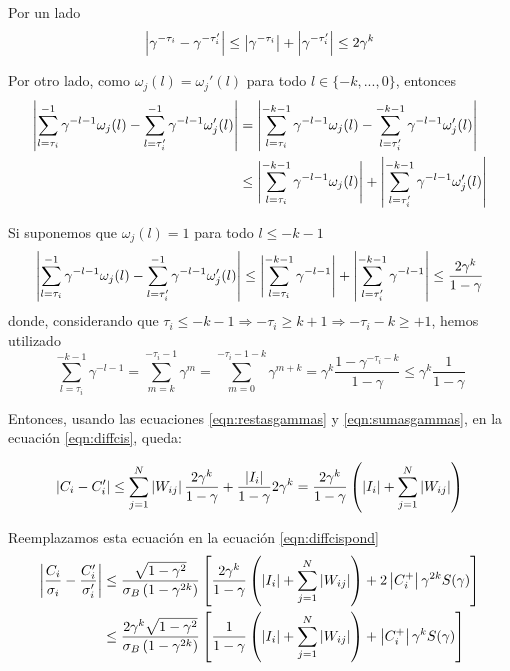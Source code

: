 Por un lado
\begin{equation}
    \left|\gamma^{-\tau_i} - \gamma^{-\tau_i'} \right| \leq \left|\gamma^{-\tau_i}\right| + \left|\gamma^{-\tau_i'} \right| \leq 2 \gamma^k
    \label{eqn:restasgammas}
\end{equation}

Por otro lado, como $\omega_j(l)=\omega_j'(l)$ para todo $l \in \{-k, ..., 0\}$, entonces
\begin{align*}
    \left| \sum_{l=\tau_i}^{-1}\gamma^{-l-1} \omega_j(l) -\sum_{l=\tau_i'}^{-1} \gamma^{-l-1} \omega_j'(l) \right| & = 
    \left| \sum_{l=\tau_i}^{-k-1}\gamma^{-l-1} \omega_j(l) -\sum_{l=\tau_i'}^{-k-1} \gamma^{-l-1} \omega_j'(l) \right|  \\
    & \leq\left| \sum_{l=\tau_i}^{-k-1}\gamma^{-l-1} \omega_j(l)\right| + \left|\sum_{l=\tau_i'}^{-k-1} \gamma^{-l-1} \omega_j'(l) \right|
\end{align*}

Si suponemos que $\omega_j(l)=1$ para todo $l \leq -k-1$ 
\begin{equation}
    \left| \sum_{l=\tau_i}^{-1}\gamma^{-l-1} \omega_j(l) -\sum_{l=\tau_i'}^{-1} \gamma^{-l-1} \omega_j'(l) \right| \leq
    \left| \sum_{l=\tau_i}^{-k-1}\gamma^{-l-1}\right| + \left|\sum_{l=\tau_i'}^{-k-1} \gamma^{-l-1} \right| 
    \leq  \frac{2\gamma^k}{1-\gamma}
    \label{eqn:sumasgammas}
\end{equation}
donde, considerando que $\tau_i \leq -k-1  \Rightarrow -\tau_i \geq k+1 \Rightarrow -\tau_i -k \geq +1$, hemos utilizado
\begin{equation}
    \sum_{l=\tau_i}^{-k-1}\gamma^{-l-1} = \sum_{m=k}^{-\tau_i-1}\gamma^{m} = \sum_{m=0}^{-\tau_i-1-k}\gamma^{m+k} =  \gamma^k \frac{1-\gamma^{-\tau_i-k}}{1-\gamma} \leq
    \gamma^k \frac{1}{1-\gamma}
\end{equation}


Entonces, usando las ecuaciones \eqref{eqn:restasgammas} y \eqref{eqn:sumasgammas}, en la ecuación \eqref{eqn:diffcis}, queda:

\begin{equation}
 \left| C_i - C_i' \right| \leq 
 \sum_{j=1}^N \left|W_{ij}\right|  \frac{2\gamma^k}{1-\gamma} + \frac{\left|I_i\right|}{1-\gamma} 2 \gamma^k =
 \frac{2 \gamma^k}{1-\gamma} \left(\left|I_i\right| + \sum_{j=1}^N \left|W_{ij}\right| \right)
\end{equation}

Reemplazamos esta ecuación en la ecuación \eqref{eqn:diffcispond}
\begin{align}
\nonumber \left|\frac{C_i}{\sigma_i} - \frac{C_i'}{\sigma_i'}\right| &
    \leq \frac{\sqrt{1-\gamma^2}}{\sigma_B \left(1-\gamma^{2k}\right)} 
    \left[ \frac{2 \gamma^k }{1-\gamma} \left( \left|I_i\right| + \sum_{j=1}^N \left|W_{ij}\right| \right) + 2 \left|C_i^+\right| \gamma^{2k} S(\gamma) \right] \\
    &\leq \frac{2 \gamma^k \sqrt{1-\gamma^2}}{\sigma_B \left(1-\gamma^{2k}\right)} 
    \left[ \frac{1 }{1-\gamma} \left( \left|I_i\right| + \sum_{j=1}^N \left|W_{ij}\right| \right) + \left|C_i^+\right|  \gamma^k S(\gamma) \right]
    \label{eqn:diffcispond2}
\end{align}

